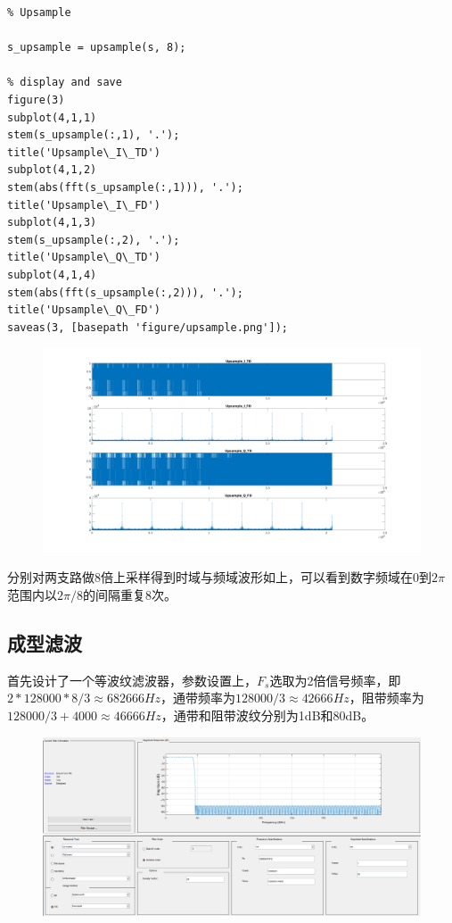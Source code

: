\begin{spacing}{1.5}
\begin{lstlisting}
% Upsample

s_upsample = upsample(s, 8);

% display and save
figure(3)
subplot(4,1,1)
stem(s_upsample(:,1), '.');
title('Upsample\_I\_TD')
subplot(4,1,2)
stem(abs(fft(s_upsample(:,1))), '.');
title('Upsample\_I\_FD')
subplot(4,1,3)
stem(s_upsample(:,2), '.');
title('Upsample\_Q\_TD')
subplot(4,1,4)
stem(abs(fft(s_upsample(:,2))), '.');
title('Upsample\_Q\_FD')
saveas(3, [basepath 'figure/upsample.png']);
\end{lstlisting}

\begin{figure}[H]
\centering
\includegraphics[width = \columnwidth]{upsample.png}
\end{figure}

分别对两支路做8倍上采样得到时域与频域波形如上，可以看到数字频域在0到$2\pi$范围内以$2\pi/8$的间隔重复8次。

\subsection{成型滤波}

首先设计了一个等波纹滤波器，参数设置上，$F_s$选取为2倍信号频率，即$2 * 128000 * 8 / 3 \approx 682666 Hz$，通带频率为$128000 / 3 \approx 42666 Hz$，阻带频率为$128000 / 3 + 4000 \approx  46666 Hz$，通带和阻带波纹分别为1dB和80dB。

\begin{figure}[H]
\centering
\includegraphics[width = 0.8\columnwidth]{filterparam.png}
\end{figure}


\end{spacing}
